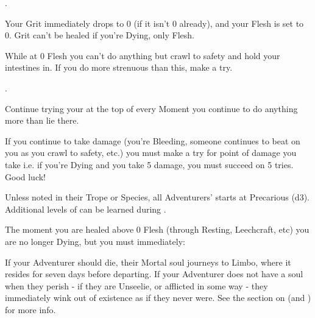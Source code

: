 
 .  


Your Grit immediately drops to 0 (if it isn't 0 already), and your Flesh is set to 0. Grit can't be healed if you're Dying, only Flesh.

  While at 0 Flesh you can't do anything but crawl to safety and hold your intestines in. If you do  more strenuous than this, make a \DEATH try. 

. 

Continue trying your \DEATH at the top of every Moment you continue to do anything more than lie there. 

  If you continue to take damage (you're Bleeding, someone continues to beat on you as you crawl to safety, etc.) you must make a \DEATH try for  point of damage you take i.e. if you're Dying and you take 5 damage, you must succeed on 5 \DEATH tries.  Good luck!

  Unless noted in their Trope or Species, all Adventurers' \DEATH starts at Precarious (d3).  Additional levels of \DEATH can be learned during .

  The moment you are healed above 0 Flesh (through Resting, Leechcraft, etc) you are no longer Dying, but you must immediately:


\cbreak


If your Adventurer should die, their Mortal soul journeys to Limbo, where it resides for seven days before departing. If your Adventurer does not have a soul when they perish - if they are Unseelie, or afflicted in some way - they immediately wink out of existence as if they never were.  See the section on  (and ) for more info.





